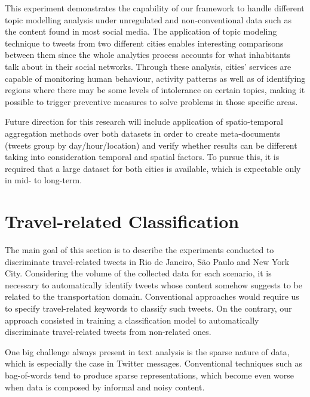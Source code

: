 This experiment demonstrates the capability of our framework to handle different topic modelling analysis under unregulated and non-conventional data such as the content found in most social media. The application of topic modeling technique to tweets from two different cities enables interesting comparisons between them since the whole analytics process accounts for what inhabitants talk about in their social networks. Through these analysis, cities' services are capable of monitoring human behaviour, activity patterns as well as of identifying regions where there may be some levels of intolerance on certain topics, making it possible to trigger preventive measures to solve problems in those specific areas.

Future direction for this research will include application of spatio-temporal aggregation methods over both datasets in order to create meta-documents (tweets group by day/hour/location) and verify whether results can be different taking into consideration temporal and spatial factors. To pursue this, it is required that a large dataset for both cities is available, which is expectable only in mid- to long-term.

\section{Travel-related Classification}
\label{sec:travel_related_classification}
The main goal of this section is to describe the experiments conducted to discriminate travel-related tweets in Rio de Janeiro, São Paulo and New York City. Considering the volume of the collected data for each scenario, it is necessary to automatically identify tweets whose content somehow suggests to be related to the transportation domain. Conventional approaches would require us to specify travel-related keywords to classify such tweets. On the contrary, our approach consisted in training a classification model to automatically discriminate travel-related tweets from non-related ones. 

One big challenge always present in text analysis is the sparse nature of data, which is especially the case in Twitter messages. Conventional techniques such as bag-of-words tend to produce sparse representations, which become even worse when data is composed by informal and noisy content.

